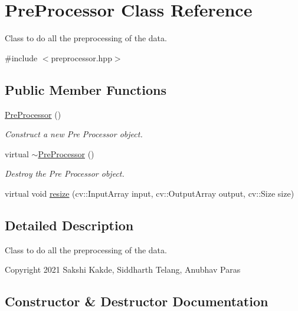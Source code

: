 \hypertarget{classPreProcessor}{}\section{Pre\+Processor Class Reference}
\label{classPreProcessor}


Class to do all the preprocessing of the data.  




{\ttfamily \#include $<$preprocessor.\+hpp$>$}

\subsection*{Public Member Functions}
\begin{DoxyCompactItemize}
\item 
\hyperlink{classPreProcessor_ab0196882f25fc9aff349f4669d35de22}{Pre\+Processor} ()
\begin{DoxyCompactList}\small\item\em Construct a new Pre Processor object. \end{DoxyCompactList}\item 
\mbox{\label{classPreProcessor_a5f0d6e2fd5982f2c5f197035beaeed6b}} 
virtual \hyperlink{classPreProcessor_a5f0d6e2fd5982f2c5f197035beaeed6b}{$\sim$\+Pre\+Processor} ()
\begin{DoxyCompactList}\small\item\em Destroy the Pre Processor object. \end{DoxyCompactList}\item 
virtual void \hyperlink{classPreProcessor_a49b49d13b2422e02ff7817e965d174df}{resize} (cv\+::\+Input\+Array input, cv\+::\+Output\+Array output, cv\+::\+Size size)
\end{DoxyCompactItemize}


\subsection{Detailed Description}
Class to do all the preprocessing of the data. 

Copyright 2021 Sakshi Kakde, Siddharth Telang, Anubhav Paras 

\subsection{Constructor \& Destructor Documentation}
\mbox{\label{classPreProcessor_ab0196882f25fc9aff349f4669d35de22}} 

